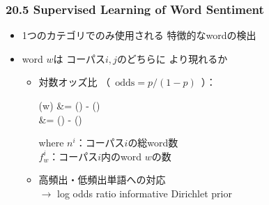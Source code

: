 \begin{frame}
    \frametitle{20.5 Supervised Learning of Word Sentiment}
    \begin{itemize}
        \item 1つのカテゴリでのみ使用される 特徴的なwordの検出
        \item word $w$は コーパス$i, j$のどちらに より現れるか
        \begin{itemize}
            \item 対数オッズ比 {\footnotesize（\ $\mathrm{odds}= p/(1-p)$\ ）}：
            \begin{yalign*}
                (w) &= \log\left(\right) - \log\left(\right) \\
                &= \log\left(\right) - \log\left(\right)
            \end{yalign*}
            where $n^i$：コーパス$i$の総word数 \\
             $f^{i}_{w}$：コーパス$i$内のword $w$の数 \\
            \item 高頻出・低頻出単語への対応 \\
            $\to$ log odds ratio informative Dirichlet prior 
        \end{itemize}
    \end{itemize}
\end{frame}


